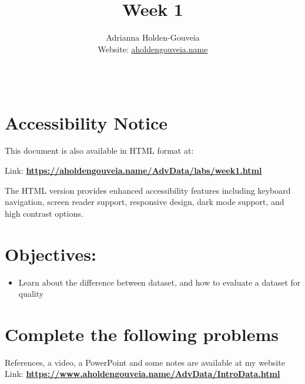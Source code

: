\documentclass[12pt]{article}
\title{Week 1}
\author{
        Adrianna Holden-Gouveia \\
        Website: \href{https://aholdengouveia.name}{aholdengouveia.name}\\ 
        \date{\vspace{-5ex}}
        \faGithub {: aholdengouveia} \\
        }
\begin{document}
    

\maketitle



\section*{Accessibility Notice}
This document is also available in HTML format at:

Link: \href{https://aholdengouveia.name/AdvData/labs/week1.html}{\textbf{https://aholdengouveia.name/AdvData/labs/week1.html}}

The HTML version provides enhanced accessibility features including keyboard navigation, screen reader support, responsive design, dark mode support, and high contrast options.

\section*{Objectives:}
\begin{itemize}
    \item Learn about the difference between dataset, and how to evaluate a dataset for quality
\end{itemize}
\section*{Complete the following problems}

References, a video, a PowerPoint and some notes are available at my website
Link: \href{https://www.aholdengouveia.name/AdvData/IntroData.html}{\textbf{https://www.aholdengouveia.name/AdvData/IntroData.html}}
\end{document}
